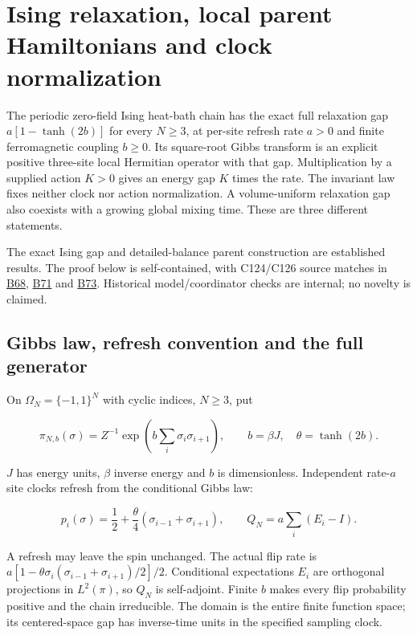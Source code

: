 \documentclass[11pt,a4paper]{article}
\begin{document}
\hypertarget{ising-relaxation-local-parent-hamiltonians-and-clock-normalization}{%
\section{Ising relaxation, local parent Hamiltonians and clock
normalization}\label{ising-relaxation-local-parent-hamiltonians-and-clock-normalization}}

The periodic zero-field Ising heat-bath chain has the exact full
relaxation gap \(a[1-\tanh(2b)]\) for every \(N\ge3\), at per-site
refresh rate \(a>0\) and finite ferromagnetic coupling \(b\ge0\). Its
square-root Gibbs transform is an explicit positive three-site local
Hermitian operator with that gap. Multiplication by a supplied action
\(K>0\) gives an energy gap \(K\) times the rate. The invariant law
fixes neither clock nor action normalization. A volume-uniform
relaxation gap also coexists with a growing global mixing time. These
are three different statements.

The exact Ising gap and detailed-balance parent construction are
established results. The proof below is self-contained, with C124/C126
source matches in \href{../references/batches/B68.md}{B68},
\href{../references/batches/B71.md}{B71} and
\href{../references/batches/B73.md}{B73}. Historical model/coordinator
checks are internal; no novelty is claimed.

\hypertarget{gibbs-law-refresh-convention-and-the-full-generator}{%
\subsection{Gibbs law, refresh convention and the full
generator}\label{gibbs-law-refresh-convention-and-the-full-generator}}

On \(\Omega_N=\{-1,1\}^N\) with cyclic indices, \(N\ge3\), put

\[\pi_{N,b}(\sigma)=Z^{-1}\exp\left(b\sum_i\sigma_i\sigma_{i+1}\right),
\qquad b=\beta J,\quad\theta=\tanh(2b).\]

\(J\) has energy units, \(\beta\) inverse energy and \(b\) is
dimensionless. Independent rate-\(a\) site clocks refresh from the
conditional Gibbs law:

\[p_i(\sigma)=\frac12+\frac\theta4(\sigma_{i-1}+\sigma_{i+1}),\qquad
Q_N=a\sum_i(E_i-I).\]

A refresh may leave the spin unchanged. The actual flip rate is
\(a[1-\theta\sigma_i(\sigma_{i-1}+\sigma_{i+1})/2]/2\). Conditional
expectations \(E_i\) are orthogonal projections in \(L^2(\pi)\), so
\(Q_N\) is self-adjoint. Finite \(b\) makes every flip probability
positive and the chain irreducible. The domain is the entire finite
function space; its centered-space gap has inverse-time units in the
specified sampling clock.
\end{document}

